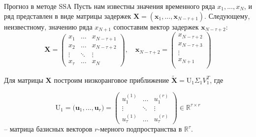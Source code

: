 \begin{frame}{Прогноз в методе SSA}
    Пусть нам известны значения временного ряда $x_1, ..., x_N$, и ряд представлен в виде матрицы задержек $\mathbf{X} = (\mathbf{x}_1, ..., \mathbf{x}_{N - \tau + 1})$. Следующему, неизвестному, значению ряда $x_{N+1}$ сопоставим вектор задержек $\mathbf{x}_{N - \tau + 2}$:
    $$ \mathbf{X} = \begin{pmatrix}
    x_1 &  \dots & x_{N - \tau + 1} \\
    x_2 &  \dots & x_{N - \tau + 2} \\
    \vdots &  \ddots & \vdots \\
    x_{\tau} & \dots & x_N 
    \end{pmatrix}, \quad 
    \mathbf{x}_{N - \tau + 2} = \begin{pmatrix}
        x_{N - \tau + 2} \\
        x_{N - \tau + 3} \\
        \vdots \\
        x_{N  + 1} \\
    \end{pmatrix} $$

    Для матрицы $\mathbf{X}$ построим низкоранговое приближение $\tilde{\mathbf{X}} = \text{U}_1 \Sigma_1 V_1^T$, где 
    
    $$\text{U}_1 = \Big(\mathbf{u}_1, ..., \mathbf{u}_r\Big) = 
    \begin{pmatrix}
    u^{(1)}_1 & \dots & u^{(r)}_1 \\
    \vdots & \ddots & \vdots \\
    u^{(1)}_\tau & \dots & u^{(r)}_\tau 
    \end{pmatrix} \in \mathbb{R}^{\tau \times r}$$
    -- матрица базисных векторов $r$-мерного подпространства в $\mathbb{R}^{\tau}$.
\end{frame}



